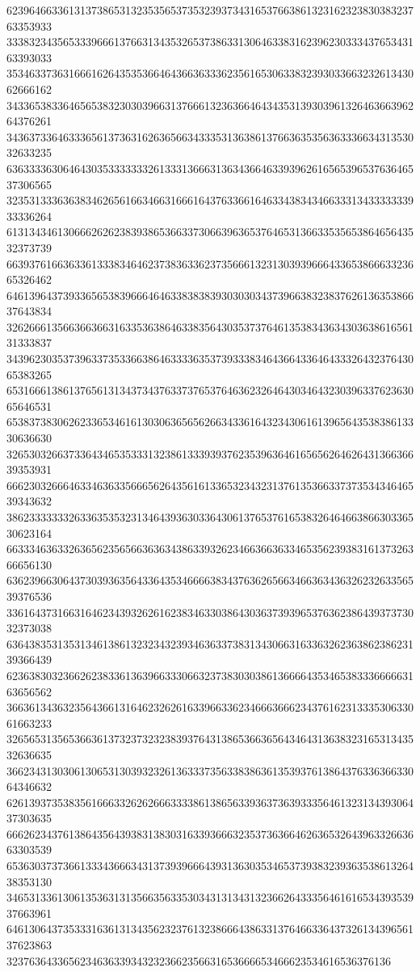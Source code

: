 62396466336131373865313235356537353239373431653766386132316232383038323763353933
33383234356533396661376631343532653738633130646338316239623033343765343163393033
35346337363166616264353536646436636333623561653063383239303366323261343062666162
34336538336465653832303039663137666132363664643435313930396132646366396264376261
34363733646333656137363162636566343335313638613766363535636333663431353032633235
63633336306464303533333332613331366631363436646339396261656539653763646537306565
32353133363638346265616634663166616437633661646334383434663331343333333933336264
61313434613066626262383938653663373066396365376465313663353565386465643532373739
66393761663633613338346462373836336237356661323130393966643365386663323665326462
64613964373933656538396664646338383839303030343739663832383762613635386637643834
32626661356636636631633536386463383564303537376461353834363430363861656131333837
34396230353739633735336638646333363537393338346436643364643332643237643065383265
65316661386137656131343734376337376537646362326464303464323039633762363065646531
65383738306262336534616130306365656266343361643234306161396564353838613330636630
32653032663733643465353331323861333939376235396364616565626462643136636639353931
66623032666463346363356665626435616133653234323137613536633737353434646539343632
38623333333263363535323134643936303364306137653761653832646466386630336530623164
66333463633263656235656636363438633932623466366363346535623938316137326366656130
63623966306437303936356433643534666638343763626566346636343632623263356539376536
33616437316631646234393262616238346330386430363739396537636238643937373032373038
63643835313531346138613232343239346363373831343066316336326236386238623139366439
62363830323662623833613639663330663237383030386136666435346538333666663163656562
36636134363235643661316462326261633966336234666366623437616231333530633061663233
32656531356536636137323732323839376431386536636564346431363832316531343532636635
36623431303061306531303932326136333735633838636135393761386437633636633064346632
62613937353835616663326262666333386138656339363736393335646132313439306437303635
66626234376138643564393831383031633936663235373636646263653264396332663663303539
65363037373661333436663431373939666439313630353465373938323936353861326438353130
34653133613061353631313566356335303431313431323662643335646161653439353937663961
64613064373533316361313435623237613238666438633137646633643732613439656137623863
32376364336562346363393432323662356631653666653466623534616536376136

